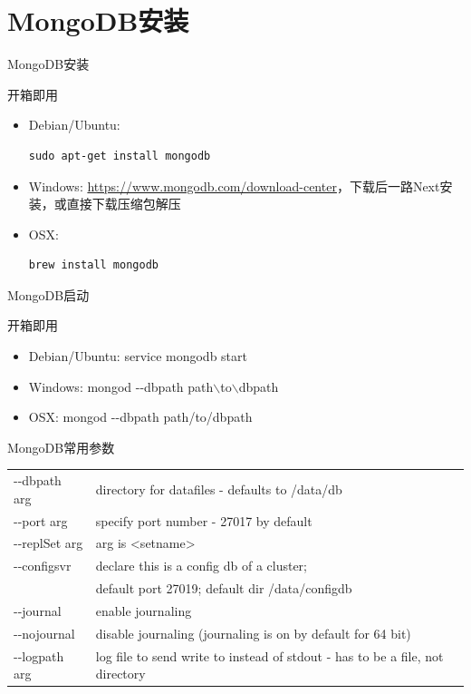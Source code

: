 \documentclass{beamer}
\begin{document}
\section{MongoDB安装}
\begin{frame}[t,fragile]{MongoDB安装}
\begin{block}{开箱即用}
	\begin{itemize}
		\item Debian/Ubuntu: \begin{verbatim}sudo apt-get install mongodb\end{verbatim}
		\item Windows: \url{https://www.mongodb.com/download-center}，下载后一路Next安装，或直接下载压缩包解压
		\item OSX: \begin{verbatim}brew install mongodb\end{verbatim}
	\end{itemize}
\end{block}
\end{frame}
\begin{frame}[t]{MongoDB启动}
\begin{block}{开箱即用}
	\begin{itemize}
		\item Debian/Ubuntu: service mongodb start
		\item Windows: mongod -{}-dbpath path$\backslash$to$\backslash$dbpath
		\item OSX: mongod -{}-dbpath path/to/dbpath
	\end{itemize}
\end{block}
\end{frame}
\begin{frame}[t]{MongoDB常用参数}
	\scriptsize
	\begin{tabular}{ll}
-{}-dbpath arg  & directory for datafiles - defaults to /data/db                                \\
-{}-port arg    & specify port number - 27017 by default                                        \\
-{}-replSet arg & arg is <setname>                                                              \\
-{}-configsvr   & declare this is a config db of a cluster;                                     \\
                & default port 27019; default dir /data/configdb                                \\
-{}-journal     & enable journaling                                                             \\
-{}-nojournal   & disable journaling (journaling is on by default for 64 bit)                   \\
-{}-logpath arg & log file to send write to instead of stdout - has to be a file, not directory \\
	\end{tabular}
\end{frame}
\end{document}
